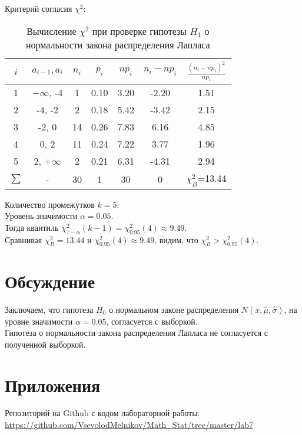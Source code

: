 Критерий согласия $\chi^2$:
\begin{table}[h]
	\centering
		\begin{tabular} {|c|c|c|c|c|c|c|}
			\hline
			$i$ & $a_{i-1}, a_i$ & $n_i$ & $p_i$ & $np_i$ & $n_i-np_i$ & $\frac{(n_i-np_i)^2}{np_i}$ \\ \hline
			1 & $-\infty$, -4 & 1 & 0.10 & 3.20 & -2.20 & 1.51 \\ \hline
			2 & -4, -2 & 2 & 0.18 & 5.42 & -3.42 & 2.15 \\ \hline
			3 & -2, 0 & 14 & 0.26 & 7.83 & 6.16 & 4.85 \\ \hline
			4 & 0, 2 & 11 & 0.24 & 7.22 & 3.77 & 1.96 \\ \hline
			5 & 2, $+\infty$ & 2 & 0.21 & 6.31 & -4.31 & 2.94 \\ \hline
			$\sum$ & - & 30 & 1 & 30 & 0 & $\chi_B^2$=13.44 \\ \hline
		\end{tabular}
		\caption{Вычисление $\chi^2$ при проверке гипотезы $H_1$ о нормальности закона распределения Лапласа}
\end{table}

Количество промежутков $k=5$.\\

Уровень значимости $\alpha=0.05$.\\

Тогда квантиль $\chi_{1-\alpha}^2(k-1)=\chi_{0.95}^2(4)\approx9.49$.\\

Сравнивая $\chi_B^2=13.44$ и $\chi_{0.95}^2(4)\approx9.49$, видим, что $\chi_B^2>\chi_{0.95}^2(4)$.

\section{Обсуждение}
Заключаем, что гипотеза $H_0$ о нормальном законе распределения $N(x, \widehat{\mu}, \widehat{\sigma})$, на уровне значимости $\alpha=0.05$, согласуется с выборкой.\\
Гипотеза о нормальности закона распределения Лапласа не согласуется с полученной выборкой.

\section{Приложения}
Репозиторий на Github с кодом лабораторной работы:\\
\url{https://github.com/VsevolodMelnikov/Math_Stat/tree/master/lab7}

